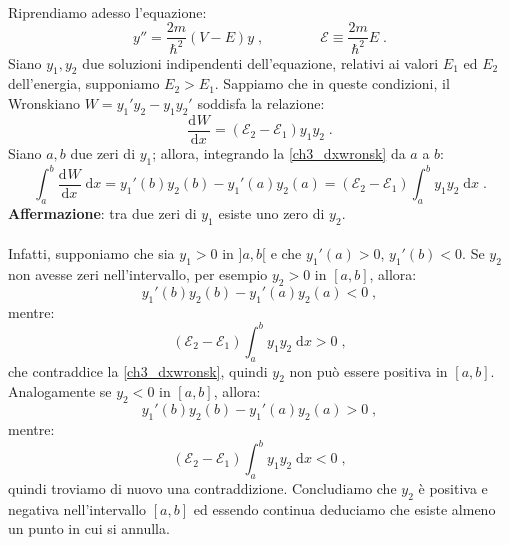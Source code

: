 \documentclass[10pt,a4paper]{report}
\theoremstyle{definition}
\newcommand{\dev}[3][]{\frac{\mathrm{d}^{#1} #2}{\mathrm{d} #3^{#1}}}
\numberwithin{equation}{section}
\newcommand{\diff}[1][]{\mathrm{d}#1}
\begin{document}
\\
Riprendiamo adesso l'equazione:
\begin{equation}
y''=\frac{2m}{\hbar^2}(V-E)y\;, \qquad\qquad \mathcal{E}\equiv \frac{2m}{\hbar^2}E\;.
\end{equation}
Siano $y_1,y_2$ due soluzioni indipendenti dell'equazione, relativi ai valori $E_1$ ed $E_2$ dell'energia, supponiamo $E_2>E_1$. Sappiamo che in queste condizioni, il Wronskiano $W=y_1'y_2-y_1y_2'$ soddisfa la relazione:
\begin{equation}
\dev{W}{x}=(\mathcal{E}_2-\mathcal{E}_1)y_1y_2\;. \label{ch3_dxwronsk}
\end{equation}
Siano $a,b$ due zeri di $y_1$; allora, integrando la \eqref{ch3_dxwronsk} da $a$ a $b$:
\begin{equation}
\int_a^b\dev{W}{x}\; \diff{x}=y_1'(b)y_2(b)-y_1'(a)y_2(a)=(\mathcal{E}_2-\mathcal{E}_1)\int_a^b y_1y_2\;\diff{x}\;.
\end{equation}
\textbf{Affermazione}: tra due zeri di $y_1$ esiste uno zero di $y_2$. \\
\\
Infatti, supponiamo che sia $y_1>0$ in $]a,b[$ e che $y_1'(a)>0$, $y_1'(b)<0$. Se $y_2$ non avesse zeri nell'intervallo, per esempio $y_2>0$ in $[a,b]$, allora:
$$
y_1'(b)y_2(b)-y_1'(a)y_2(a)<0\;,
$$
mentre:
$$
(\mathcal{E}_2-\mathcal{E}_1)\int_a^b y_1y_2\;\diff{x}>0\;,
$$
che contraddice la \eqref{ch3_dxwronsk}, quindi $y_2$ non può essere positiva in $[a,b]$. Analogamente se $y_2<0$ in $[a,b]$, allora:
$$
y_1'(b)y_2(b)-y_1'(a)y_2(a)>0\;,
$$
mentre:
$$
(\mathcal{E}_2-\mathcal{E}_1)\int_a^b y_1y_2\;\diff{x}<0\;,
$$
quindi troviamo di nuovo una contraddizione. Concludiamo che $y_2$ è positiva e negativa nell'intervallo $[a,b]$ ed essendo continua deduciamo che esiste almeno un punto in cui si annulla.
\end{document}
